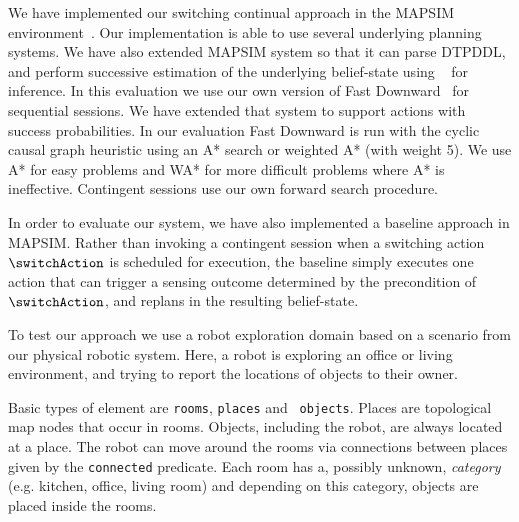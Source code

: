 
We have implemented our switching continual approach in the MAPSIM
environment~\cite{brenner:nebel:jaamas09}. Our implementation is able
to use several underlying planning systems. We have also extended
MAPSIM system so that it can parse DTPDDL, and perform successive
estimation of the underlying belief-state using
~\cite{king:2009} for inference.  In this evaluation
we use our own version of Fast Downward~\cite{fast-downward} for
sequential sessions. We have extended that system to support actions
with success probabilities. In our evaluation Fast Downward is run
with the cyclic causal graph heuristic using an A* search or weighted
A* (with weight 5). We use A* for easy problems and WA* for more
difficult problems where A* is ineffective. Contingent sessions use
our own forward search procedure.



In order to evaluate our system, we have also implemented a baseline
approach in MAPSIM. Rather than invoking a contingent session when a
switching action $\switchAction$ is scheduled for execution, the
baseline simply executes one action that can trigger a sensing outcome
determined by the precondition of $\switchAction$, and replans in the
resulting belief-state.






To test our approach we use a robot exploration domain based on a
scenario from our physical robotic system. Here, a robot is
exploring an office or living environment, and trying to report the
locations of objects to their owner.

%   
Basic types of element are {\tt rooms}, {\tt places} and {\tt
  objects}. Places are topological map nodes that occur in rooms.
Objects, including the robot, are always located at a place. The robot
can move around the rooms via connections between places given by the
{\tt connected} predicate. Each room has a, possibly unknown, {\em
  category} (e.g. kitchen, office, living room) and depending on this
category, objects are placed inside the rooms.

